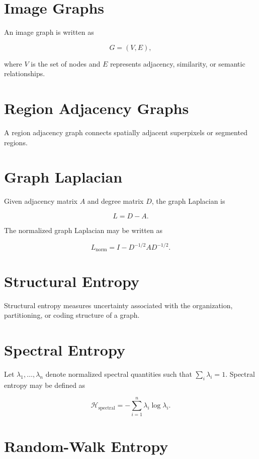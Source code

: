 \documentclass[11pt,oneside]{book}
\theoremstyle{remark}
\newcommand{\Entropy}{\mathcal{H}}
\begin{document}
	\section{Image Graphs}
	
	An image graph is written as
	
	\[
	G=(V,E),
	\]
	
	where \(V\) is the set of nodes and \(E\) represents adjacency, similarity,
	or semantic relationships.
	
	\section{Region Adjacency Graphs}
	
	A region adjacency graph connects spatially adjacent superpixels or segmented
	regions.
	
	\section{Graph Laplacian}
	
	Given adjacency matrix \(A\) and degree matrix \(D\), the graph Laplacian is
	
	\[
	L=D-A.
	\]
	
	The normalized graph Laplacian may be written as
	
	\[
	L_{\mathrm{norm}}
	=
	I-D^{-1/2}AD^{-1/2}.
	\]
	
	\section{Structural Entropy}
	
	Structural entropy measures uncertainty associated with the organization,
	partitioning, or coding structure of a graph.
	
	\section{Spectral Entropy}
	
	Let \(\lambda_1,\ldots,\lambda_n\) denote normalized spectral quantities such
	that \(\sum_i\lambda_i=1\). Spectral entropy may be defined as
	
	\[
	\Entropy_{\mathrm{spectral}}
	=
	-\sum_{i=1}^{n}
	\lambda_i\log\lambda_i.
	\]
	
	\section{Random-Walk Entropy}
	
\end{document}
